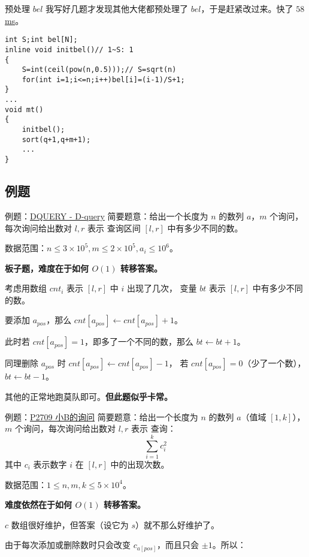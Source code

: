 \documentclass[table]{beamer}
\begin{document}
\begin{frame}[fragile]{预处理 $bel$}
	我写好几题才发现其他大佬都预处理了 $bel$，于是赶紧改过来。快了 \href{https://www.luogu.com.cn/record/138365971}{\color{blue}$58$ ms}。
	\small
\begin{verbatim}
int S;int bel[N];
inline void initbel()// 1~S: 1
{
    S=int(ceil(pow(n,0.5)));// S=sqrt(n)
    for(int i=1;i<=n;i++)bel[i]=(i-1)/S+1;
}
...
void mt()
{
    initbel();
    sort(q+1,q+m+1);
    ...
}
\end{verbatim}
\end{frame}

\subsection{例题}

\begin{frame}{例题：{\color{blue}\href{https://www.luogu.com.cn/problem/SP3267}{DQUERY - D-query}}}
	简要题意：给出一个长度为 $n$ 的数列 $a$，$m$ 个询问，每次询问给出数对 $l,r$ 表示
	查询区间 $[l,r]$ 中有多少不同的数。

	数据范围：$n\le 3\times10^5,m\le2\times10^5,a_i\le10^6$。
	\pause

	\textbf{板子题，难度在于如何 $O(1)$ 转移答案。}
	\pause

	考虑用数组 $cnt_i$ 表示 $[l,r]$ 中 $i$ 出现了几次，
	变量 $bt$ 表示 $[l,r]$ 中有多少不同的数。
	
	要添加 $a_{pos}$，那么 $cnt[a_{pos}]\gets cnt[a_{pos}]+1$。

	此时若 $cnt[a_{pos}]=1$，即多了一个不同的数，那么 $bt\gets bt+1$。

	同理删除 $a_{pos}$ 时 $cnt[a_{pos}]\gets cnt[a_{pos}]-1$，
	若 $cnt[a_{pos}]=0$（少了一个数），$bt\gets bt-1$。

	其他的正常地跑莫队即可。\textbf{但此题似乎卡常。}
\end{frame}

\begin{frame}{例题：{\color{blue}\href{https://www.luogu.com.cn/problem/P2709}{P2709 小B的询问}}}
	简要题意：给出一个长度为 $n$ 的数列 $a$（值域 $[1,k]$），$m$ 个询问，每次询问给出数对 $l,r$ 表示
	查询：  
	$$\sum\limits_{i=1}^k c_i^2$$
	其中 $c_i$ 表示数字 $i$ 在 $[l,r]$ 中的出现次数。  

	数据范围：$1\le n,m,k \le 5\times 10^4$。
	\pause

	\textbf{难度依然在于如何 $O(1)$ 转移答案。}
	\pause

	$c$ 数组很好维护，但答案（设它为 $s$）就不那么好维护了。

	由于每次添加或删除数时只会改变 $c_{a[pos]}$，而且只会 $\pm1$。所以：
\end{frame}
\end{document}
